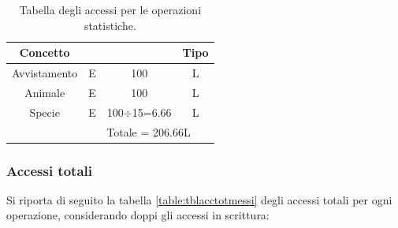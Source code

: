\documentclass[a4paper,final,12pt]{report}
\begin{document}
\begin{enumerate}
\begin{table}[hbtp]
\centering
\begin{tabular}{|c|ccc|}
\hline
\rowcolor[HTML]{C0C0C0} 
{\color[HTML]{000000} Concetto} & \multicolumn{1}{c|}{\cellcolor[HTML]{C0C0C0}{\color[HTML]{000000} Costrutto}} & \multicolumn{1}{c|}{\cellcolor[HTML]{C0C0C0}{\color[HTML]{000000} Accessi}} & {\color[HTML]{000000} Tipo} \\ \hline
{\color[HTML]{000000} Avvistamento} & \multicolumn{1}{c|}{{\color[HTML]{000000} E}} & \multicolumn{1}{c|}{{\color[HTML]{000000} 100}} & {\color[HTML]{000000} L} \\ \hline
Animale & \multicolumn{1}{c|}{E} & \multicolumn{1}{c|}{100} & L \\ \hline
Specie & \multicolumn{1}{c|}{E} & \multicolumn{1}{c|}{ 100$\div$15=6.66} & L \\ \hline
 & \multicolumn{3}{c|}{Totale = 206.66L} \\ \hline
\end{tabular}%
\caption{Tabella degli accessi per le operazioni statistiche.}
\label{table:tblaccperoprstat}
\end{table}

\end{enumerate}

\subsubsection{Accessi totali}
Si riporta di seguito la tabella \ref{table:tblacctotmessi} degli accessi totali per ogni operazione, considerando doppi gli accessi in scrittura:
\begin{table}[hbtp]
\centering
{}
\caption{Tabella degli accessi totali.}
\label{table:tblacctotmessi}
\end{table}
\end{document}
